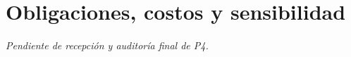 \section{Obligaciones, costos y sensibilidad}

\textit{Pendiente de recepción y auditoría final de P4.}
